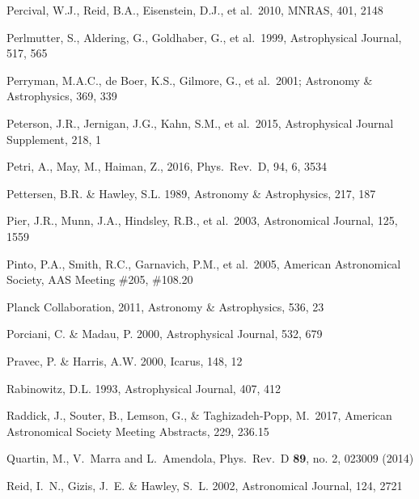 \documentclass[twocolumn]{aastex61}
\begin{document}
\begin{thebibliography}{}
 Percival, W.J., Reid, B.A., Eisenstein, D.J., et al.~2010, MNRAS, 401, 2148

 Perlmutter, S., Aldering, G., Goldhaber, G., et al.~1999, Astrophysical Journal, 517, 565

 Perryman, M.A.C., de Boer, K.S., Gilmore, G., et al.~2001; Astronomy \& Astrophysics, 369, 339

 Peterson, J.R., Jernigan, J.G., Kahn, S.M., et al.~2015, Astrophysical Journal Supplement, 218, 1

 Petri, A., May, M., Haiman, Z., 2016, Phys.~Rev.~D, 94, 6, 3534

 Pettersen, B.R. \& Hawley, S.L. 1989, Astronomy \& Astrophysics, 217, 187

 Pier, J.R., Munn, J.A., Hindsley, R.B., et al.~2003, Astronomical Journal, 125, 1559

 Pinto, P.A., Smith, R.C., Garnavich, P.M., et al.~2005, American Astronomical Society, AAS Meeting \#205, \#108.20

 Planck Collaboration, 2011,  Astronomy \& Astrophysics, 536, 23

 Porciani, C. \& Madau, P. 2000, Astrophysical Journal, 532, 679

 Pravec, P. \& Harris, A.W. 2000, Icarus, 148, 12

 Rabinowitz, D.L. 1993,  Astrophysical Journal, 407, 412

 Raddick, J., Souter, B., Lemson, G., \& Taghizadeh-Popp, M.\ 2017, American Astronomical Society Meeting Abstracts, 229, 236.15

 Quartin, M., V.~Marra and L.~Amendola, Phys.\ Rev.\ D {\bf 89}, no. 2, 023009 (2014)

 Reid, I.~N., Gizis, J.~E. \& Hawley, S.~L. 2002,  Astronomical Journal, 124, 2721


\end{thebibliography}
\end{document}
